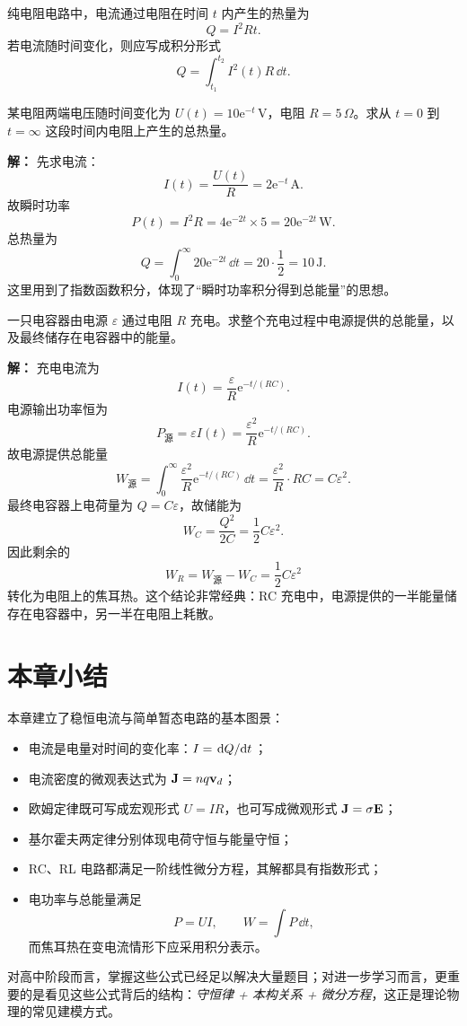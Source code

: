 \begin{law}[焦耳定律]
纯电阻电路中，电流通过电阻在时间 $t$ 内产生的热量为
\[
Q=I^2Rt.
\]
若电流随时间变化，则应写成积分形式
\[
Q=\int_{t_1}^{t_2} I^2(t)R\,\dd t.
\]
\end{law}

\begin{example}
某电阻两端电压随时间变化为 $U(t)=10\mathrm{e}^{-t}\,\text{V}$，电阻 $R=5\,\Omega$。求从 $t=0$ 到 $t=\infty$ 这段时间内电阻上产生的总热量。

\textbf{解：}
先求电流：
\[
I(t)=\frac{U(t)}{R}=2\mathrm{e}^{-t}\,\text{A}.
\]
故瞬时功率
\[
P(t)=I^2R=4\mathrm{e}^{-2t}\times 5=20\mathrm{e}^{-2t}\,\text{W}.
\]
总热量为
\[
Q=\int_0^{\infty}20\mathrm{e}^{-2t}\,\dd t
=20\cdot \frac{1}{2}=10\,\text{J}.
\]
这里用到了指数函数积分，体现了“瞬时功率积分得到总能量”的思想。
\end{example}

\begin{example}
一只电容器由电源 $\varepsilon$ 通过电阻 $R$ 充电。求整个充电过程中电源提供的总能量，以及最终储存在电容器中的能量。

\textbf{解：}
充电电流为
\[
I(t)=\frac{\varepsilon}{R}\mathrm{e}^{-t/(RC)}.
\]
电源输出功率恒为
\[
P_{\text{源}}=\varepsilon I(t)=\frac{\varepsilon^2}{R}\mathrm{e}^{-t/(RC)}.
\]
故电源提供总能量
\[
W_{\text{源}}=\int_0^{\infty}\frac{\varepsilon^2}{R}\mathrm{e}^{-t/(RC)}\,\dd t
=\frac{\varepsilon^2}{R}\cdot RC=C\varepsilon^2.
\]
最终电容器上电荷量为 $Q=C\varepsilon$，故储能为
\[
W_C=\frac{Q^2}{2C}=\frac{1}{2}C\varepsilon^2.
\]
因此剩余的
\[
W_R=W_{\text{源}}-W_C=\frac{1}{2}C\varepsilon^2
\]
转化为电阻上的焦耳热。这个结论非常经典：RC 充电中，电源提供的一半能量储存在电容器中，另一半在电阻上耗散。
\end{example}

\section{本章小结}

本章建立了稳恒电流与简单暂态电路的基本图景：
\begin{itemize}
  \item 电流是电量对时间的变化率：$I=\dv*{Q}{t}$；
  \item 电流密度的微观表达式为 $\vb{J}=nq\vb{v}_d$；
  \item 欧姆定律既可写成宏观形式 $U=IR$，也可写成微观形式 $\vb{J}=\sigma\vb{E}$；
  \item 基尔霍夫两定律分别体现电荷守恒与能量守恒；
  \item RC、RL 电路都满足一阶线性微分方程，其解都具有指数形式；
  \item 电功率与总能量满足
  \[
  P=UI,\qquad W=\int P\,\dd t,
  \]
  而焦耳热在变电流情形下应采用积分表示。
\end{itemize}

对高中阶段而言，掌握这些公式已经足以解决大量题目；对进一步学习而言，更重要的是看见这些公式背后的结构：\emph{守恒律 + 本构关系 + 微分方程}，这正是理论物理的常见建模方式。

